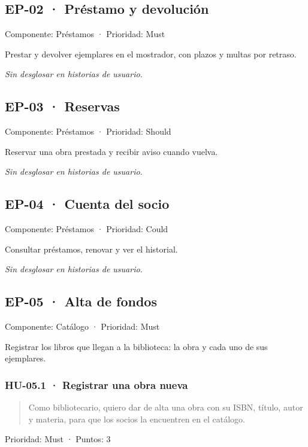 \documentclass[11pt,a4paper]{article}
\begin{document}
\subsection*{EP-02 · Préstamo y devolución}

Componente: Préstamos · Prioridad: Must

Prestar y devolver ejemplares en el mostrador, con plazos y multas por retraso.

\emph{Sin desglosar en historias de usuario.}

\subsection*{EP-03 · Reservas}

Componente: Préstamos · Prioridad: Should

Reservar una obra prestada y recibir aviso cuando vuelva.

\emph{Sin desglosar en historias de usuario.}

\subsection*{EP-04 · Cuenta del socio}

Componente: Préstamos · Prioridad: Could

Consultar préstamos, renovar y ver el historial.

\emph{Sin desglosar en historias de usuario.}

\subsection*{EP-05 · Alta de fondos}

Componente: Catálogo · Prioridad: Must

Registrar los libros que llegan a la biblioteca: la obra y cada uno de sus ejemplares.

\subsubsection*{HU-05.1 · Registrar una obra nueva}

\begin{quote}
Como bibliotecario, quiero dar de alta una obra con su ISBN, título, autor y materia, para que los socios la encuentren en el catálogo.
\end{quote}

Prioridad: Must · Puntos: 3
\end{document}
